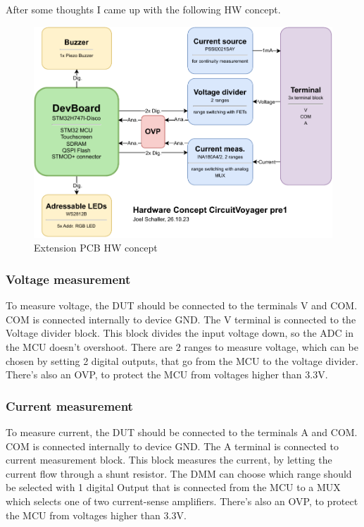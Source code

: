 After some thoughts I came up with the following HW concept.


\begin{figure}[H]
	\centering


    \includegraphics[width=15cm]{../../2_Project_Planning/HW_Concept/Hardware_Concept_CircuitVoyager_pre1.pdf}

    \vspace{0.2cm}

	\caption{Extension PCB HW concept}
	\label{fig:Extension PCB HW concept}
\end{figure}

\subsubsection{Voltage measurement}
To measure voltage, the DUT should be connected to the terminals V and COM. COM is connected internally to device GND. The V terminal is connected to the Voltage divider block. This block divides the input voltage down, so the ADC in the MCU doesn't overshoot. There are 2 ranges to measure voltage, which can be chosen by setting 2 digital outputs, that go from the MCU to the voltage divider. There's also an OVP, to protect the MCU from voltages higher than 3.3V. \cite{DMM_Video_ElectroNoobs}

\subsubsection{Current measurement}
To measure current, the DUT should be connected to the terminals A and COM. COM is connected internally to device GND. The A terminal is connected to current measurement block. This block measures the current, by letting the current flow through a shunt resistor. The DMM can choose which range should be selected with 1 digital Output that is connected from the MCU to a MUX which selects one of two current-sense amplifiers. There's also an OVP, to protect the MCU from voltages higher than 3.3V. \cite{DMM_Video_ElectroNoobs}

